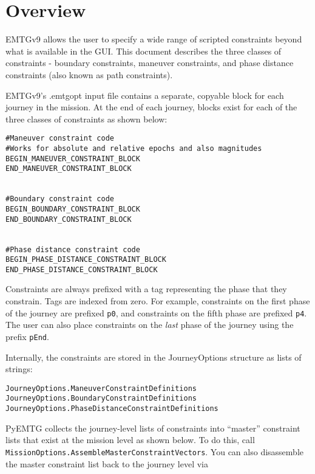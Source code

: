 \documentclass[11pt]{article}
\begin{document}
\newpage
\tableofcontents
\thispagestyle{empty}
\newpage

\clearpage
\setcounter{page}{1}



\section{Overview}
\label{sec:overview}

EMTGv9 allows the user to specify a wide range of scripted constraints beyond what is available in the GUI. This document describes the three classes of constraints - boundary constraints, maneuver constraints, and phase distance constraints (also known as path constraints).

EMTGv9's .emtgopt input file contains a separate, copyable block for each journey in the mission. At the end of each journey, blocks exist for each of the three classes of constraints as shown below:

\begin{verbatim}
#Maneuver constraint code
#Works for absolute and relative epochs and also magnitudes
BEGIN_MANEUVER_CONSTRAINT_BLOCK
END_MANEUVER_CONSTRAINT_BLOCK


#Boundary constraint code
BEGIN_BOUNDARY_CONSTRAINT_BLOCK
END_BOUNDARY_CONSTRAINT_BLOCK


#Phase distance constraint code
BEGIN_PHASE_DISTANCE_CONSTRAINT_BLOCK
END_PHASE_DISTANCE_CONSTRAINT_BLOCK
\end{verbatim}

Constraints are always prefixed with a tag representing the phase that they constrain. Tags are indexed from zero. For example, constraints on the first phase of the journey are prefixed \texttt{p0}, and constraints on the fifth phase are prefixed \texttt{p4}. The user can also place constraints on the \textit{last} phase of the journey using the prefix \texttt{pEnd}.

Internally, the constraints are stored in the JourneyOptions structure as lists of strings:

\begin{verbatim}
JourneyOptions.ManeuverConstraintDefinitions
JourneyOptions.BoundaryConstraintDefinitions
JourneyOptions.PhaseDistanceConstraintDefinitions
\end{verbatim}

PyEMTG collects the journey-level lists of constraints into ``master'' constraint lists that exist at the mission level as shown below. To do this, call \texttt{MissionOptions.AssembleMasterConstraintVectors}. You can also disassemble the master constraint list back to the journey level via 
\end{document}

